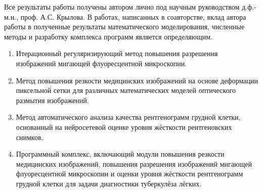 %


{\contribution} 

Все результаты работы получены автором лично под научным руководством д.ф.-м.н., проф. А.С. Крылова. В работах, написанных в соавторстве, вклад автора работы в полученные результаты математического моделирования, численные методы и разработку комплекса программ является определяющим.


{}

\begin {enumerate}[beginpenalty=10000]
	\item Итерационный регуляризирующий метод повышения разрешения изображений мигающей флуоресцентной микроскопии.
	
	\item Метод повышения резкости медицинских изображений на основе деформации пиксельной сетки для различных математических моделей оптического размытия изображений.
	
	\item Метод автоматического анализа качества рентгенограмм грудной клетки, основанный на нейросетевой оценке уровня жёсткости рентгеновских снимков.
	
	\item Программный комплекс, включающий модули повышения резкости медицинских изображений, повышения разрешения изображений мигающей флуоресцентной микроскопии и оценки уровня жёсткости рентгенограмм грудной клетки для задачи диагностики туберкулёза лёгких.
\end {enumerate}
